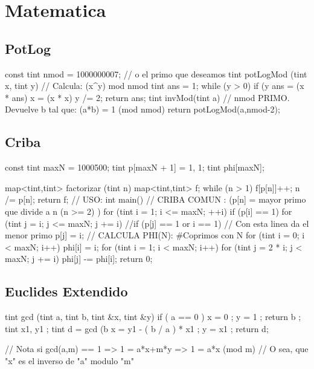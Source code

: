 \section{Matematica}

\subsection{PotLog}
\begin{code}
const tint nmod = 1000000007; // o el primo que deseamos
tint potLogMod (tint x, tint y) // Calcula: (x^y) mod nmod
{
	tint ans = 1;
	while (y > 0)
	{
		if (y %
			ans = (x * ans) %
		x = (x * x) %
		y /= 2;
	}
	return ans;
}
tint invMod(tint a) // nmod PRIMO. Devuelve b tal que: (a*b) = 1 (mod nmod) 
{
	return potLogMod(a,nmod-2);
}
\end{code}

\subsection{Criba}
\begin{code}
const tint maxN = 1000500;
tint p[maxN + 1] = {1, 1};
tint phi[maxN]; 

map<tint,tint> factorizar (tint n)
{
	map<tint,tint> f;
	while (n > 1) 
	{ 
		f[p[n]]++;
		n /= p[n]; 
	}
	return f;
}
// USO:
int main()
{
	// CRIBA COMUN : (p[n] = mayor primo que divide a n (n >= 2) )
	for (tint i = 1; i <= maxN; ++i)
		if (p[i] == 1)
			for (tint j = i; j <= maxN; j += i)
				//if (p[j] == 1 or i == 1) // Con esta linea da el menor primo
				p[j] = i;
	// CALCULA PHI(N): #Coprimos con N
	for (tint i = 0; i < maxN; i++) 
		phi[i] = i;	
	for (tint i = 1; i < maxN; i++)
	for (tint j = 2 * i; j < maxN; j += i)
		phi[j] -= phi[i];
	return 0;
}
\end{code}

\subsection{Euclides Extendido}
\begin{code}
tint gcd (tint a, tint b, tint &x, tint &y)
{
	if ( a == 0 ) 
	{
		x = 0 ; y = 1 ;
		return b ;
	}
	tint x1, y1 ;
	tint d = gcd (b %
	x = y1 - ( b / a ) * x1 ;
	y = x1 ;
	return d;
} 

// Nota si gcd(a,m) == 1 => 1 = a*x+m*y => 1 = a*x (mod m)
// O sea, que "x" es el inverso de "a" modulo "m"

\end{code}

